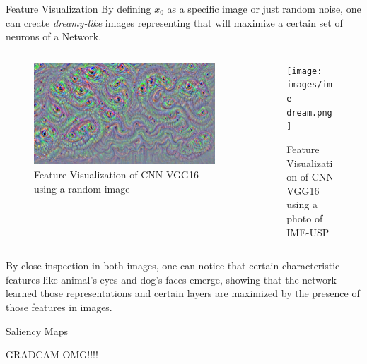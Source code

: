 \documentclass[final]{beamer}
\newlength{\colwidth}
\begin{document}
\begin{frame}[t]
\begin{columns}[t]
\begin{column}{\colwidth}
\begin{block}{Feature Visualization}
    By defining \(x_0\) as a specific image or just random noise, one can create \emph{dreamy-like} \cite{deepdream} images representing that will maximize a certain set of neurons of a Network.
    \begin{columns}  
      \begin{column}{0.5\textwidth}
        \begin{figure}
          \centering
          \includegraphics[width=\linewidth]{images/random_image_dream.png}
          \caption{Feature Visualization of CNN VGG16 using a random image}
        \end{figure}  
      \end{column}

      \begin{column}{0.5\textwidth}
        \begin{figure}
          \centering
          \texttt{[image: images/ime-dream.png]}
          \caption{Feature Visualization of CNN VGG16 using a photo of IME-USP}
        \end{figure}
      \end{column}
      
    \end{columns}

    By close inspection in both images, one can notice that certain characteristic features like animal's eyes and dog's faces emerge,
    showing that the network learned those representations and certain layers are maximized by the presence of those features in images.
  \end{block}

  \begin{block}{Saliency Maps}

    GRADCAM OMG!!!!

  \end{block}


\end{column}
\end{columns}
\end{frame}
\end{document}
